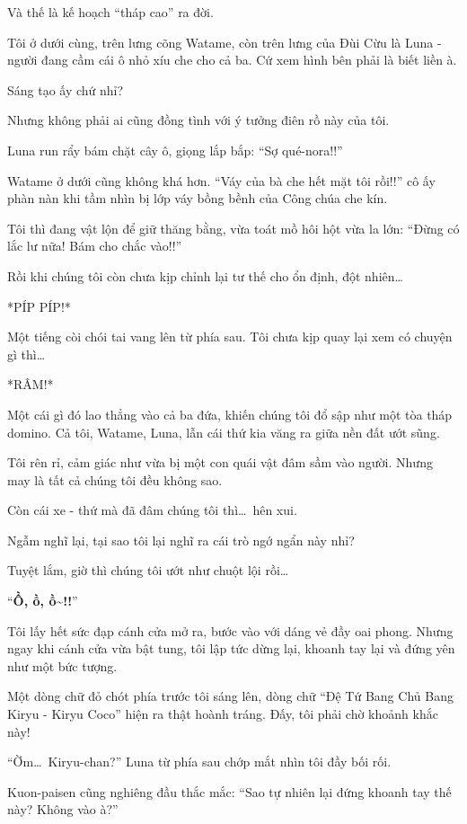 \documentclass[../main.tex]{subfiles}
\begin{document}
\ct

Và thế là kế hoạch ``tháp cao'' ra đời.

Tôi ở dưới cùng, trên lưng cõng Watame, còn trên lưng của Đùi Cừu là Luna - người đang cầm cái ô nhỏ xíu che cho cả ba. Cứ xem hình bên phải là biết liền à.

Sáng tạo ấy chứ nhỉ?

Nhưng không phải ai cũng đồng tình với ý tưởng điên rồ này của tôi.

Luna run rẩy bám chặt cây ô, giọng lắp bắp: ``Sợ qué-nora!!''

Watame ở dưới cũng không khá hơn. ``Váy của bà che hết mặt tôi rồi!!'' cô ấy phàn nàn khi tầm nhìn bị lớp váy bồng bềnh của Công chúa che kín.

Tôi thì đang vật lộn để giữ thăng bằng, vừa toát mồ hôi hột vừa la lớn: ``Đừng có lắc lư nữa! Bám cho chắc vào!!''

Rồi khi chúng tôi còn chưa kịp chỉnh lại tư thế cho ổn định, đột nhiên\dots

*PÍP PÍP!*

Một tiếng còi chói tai vang lên từ phía sau. Tôi chưa kịp quay lại xem có chuyện gì thì\dots

*RÂM!*

Một cái gì đó lao thẳng vào cả ba đứa, khiến chúng tôi đổ sập như một tòa tháp domino. Cả tôi, Watame, Luna, lẫn cái thứ kia văng ra giữa nền đất ướt sũng.

Tôi rên rỉ, cảm giác như vừa bị một con quái vật đâm sầm vào người. Nhưng may là tất cả chúng tôi đều không sao.

Còn cái xe - thứ mà đã đâm chúng tôi thì\dots\ hên xui.

Ngẫm nghĩ lại, tại sao tôi lại nghĩ ra cái trò ngớ ngẩn này nhỉ?

Tuyệt lắm, giờ thì chúng tôi ướt như chuột lội rồi\dots

\ct

``\textbf{Ồ, ồ, ồ\~{}!!}''

Tôi lấy hết sức đạp cánh cửa mở ra, bước vào với dáng vẻ đầy oai phong. Nhưng ngay khi cánh cửa vừa bật tung, tôi lập tức dừng lại, khoanh tay lại và đứng yên như một bức tượng.

Một dòng chữ đỏ chót phía trước tôi sáng lên, dòng chữ ``Đệ Tứ Bang Chủ Bang Kiryu - Kiryu Coco'' hiện ra thật hoành tráng. Đấy, tôi phải chờ khoảnh khắc này!

``Ờm\dots\ Kiryu-chan?'' Luna từ phía sau chớp mắt nhìn tôi đầy bối rối.

Kuon-paisen cũng nghiêng đầu thắc mắc: ``Sao tự nhiên lại đứng khoanh tay thế này? Không vào à?''
\end{document}
